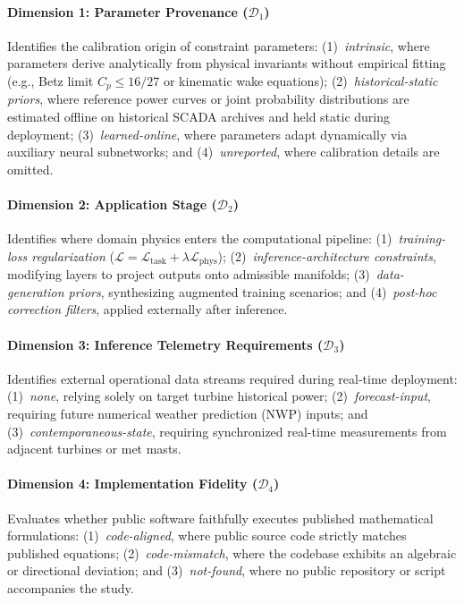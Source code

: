 \paragraph{Dimension 1: Parameter Provenance ($\mathcal{D}_1$)}
Identifies the calibration origin of constraint parameters: (1)~\textit{intrinsic}, where parameters derive analytically from physical invariants without empirical fitting (e.g., Betz limit $C_p \le 16/27$ or kinematic wake equations); (2)~\textit{historical-static priors}, where reference power curves or joint probability distributions are estimated offline on historical SCADA archives and held static during deployment; (3)~\textit{learned-online}, where parameters adapt dynamically via auxiliary neural subnetworks; and (4)~\textit{unreported}, where calibration details are omitted.

\paragraph{Dimension 2: Application Stage ($\mathcal{D}_2$)}
Identifies where domain physics enters the computational pipeline: (1)~\textit{training-loss regularization} ($\mathcal{L} = \mathcal{L}_{\text{task}} + \lambda \mathcal{L}_{\text{phys}}$); (2)~\textit{inference-architecture constraints}, modifying layers to project outputs onto admissible manifolds; (3)~\textit{data-generation priors}, synthesizing augmented training scenarios; and (4)~\textit{post-hoc correction filters}, applied externally after inference.

\paragraph{Dimension 3: Inference Telemetry Requirements ($\mathcal{D}_3$)}
Identifies external operational data streams required during real-time deployment: (1)~\textit{none}, relying solely on target turbine historical power; (2)~\textit{forecast-input}, requiring future numerical weather prediction (NWP) inputs; and (3)~\textit{contemporaneous-state}, requiring synchronized real-time measurements from adjacent turbines or met masts.

\paragraph{Dimension 4: Implementation Fidelity ($\mathcal{D}_4$)}
Evaluates whether public software faithfully executes published mathematical formulations: (1)~\textit{code-aligned}, where public source code strictly matches published equations; (2)~\textit{code-mismatch}, where the codebase exhibits an algebraic or directional deviation; and (3)~\textit{not-found}, where no public repository or script accompanies the study.

